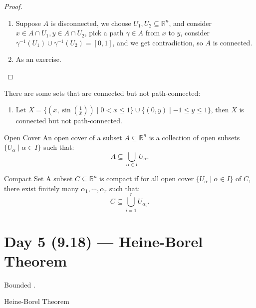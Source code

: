 \documentclass[11pt]{article}
\newenvironment{definition}[1]{\begin{defbox}{#1}{}}{\end{defbox}}
\newenvironment{theorem}[1]{\begin{thmbox}{#1}{}}{\end{thmbox}}
\newenvironment{example}[1]{\begin{exbox}{#1}{}}{\end{exbox}}
\theoremstyle{quiet}
\theoremstyle{quietremark}
\begin{document}
\begin{proof}
\begin{enumerate}
\item Suppose $A$ is disconnected, we choose $U_1,U_2\subseteq\mathbb{R}^n$, and consider $x\in A\cap U_1, y\in A\cap U_2$, pick a path $\gamma \in A$ from $x$ to $y$, consider $\gamma^{-1}(U_1)\cup \gamma^{-1}(U_2)=[0,1]$, and we get contradiction, so $A$ is connected.

\item As an exercise.
\end{enumerate}
\end{proof}

\begin{example}{}
There are some sets that are connected but not path-connected:
\begin{enumerate}
\item Let $X=\{(x,\sin(\frac{1}{x}))\mid0<x\le 1\}\cup\{(0,y)\mid -1\le y\le 1\}$, then $X$ is connected but not path-connected.
\end{enumerate}
\end{example}

\begin{definition}{Open Cover}
An open cover of a subset $A\subseteq\mathbb{R}^n$ is a collection of open subsets $\{U_\alpha\mid\alpha\in I\}$ such that:
\[
A\subseteq\bigcup_{\alpha\in I}U_\alpha.
\]
\end{definition}

\begin{definition}{Compact Set}
A subset $C\subseteq\mathbb{R}^n$ is compact if for all open cover $\{U_\alpha\mid\alpha\in I\}$ of $C$, there exist finitely many $\alpha_1,\cdots,\alpha_r$ such that:
\[
C \subseteq\bigcup_{i=1}^rU_{\alpha_i}.
\]
\end{definition}
\newpage
\section{Day 5 (9.18) --- Heine-Borel Theorem}
\begin{definition}{Bounded}
.
\end{definition}

\begin{theorem}{Heine-Borel Theorem}
\end{theorem}
\end{document}
